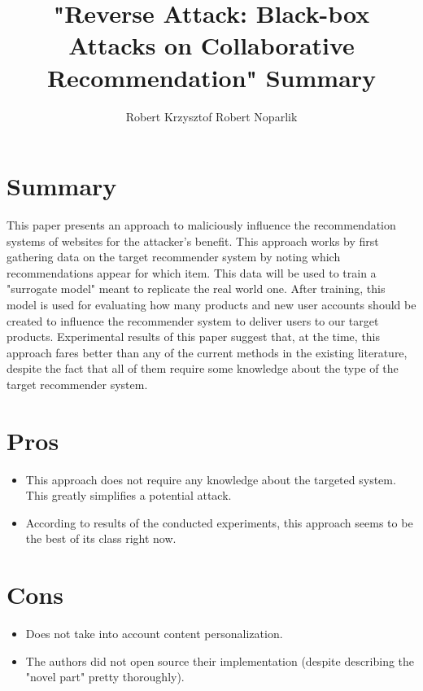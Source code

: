 \documentclass{article}
\title{"Reverse Attack: Black-box Attacks on Collaborative
Recommendation" Summary}
\author{Robert Krzysztof Robert Noparlik}
\begin{document}
\maketitle

\section{Summary}

This paper presents an approach to maliciously influence the recommendation systems of websites for the attacker's benefit. This approach works by first gathering data on the target recommender system by noting which recommendations appear for which item. This data will be used to train a "surrogate model" meant to replicate the real world one. After training, this model is used for evaluating how many products and new user accounts should be created to influence the recommender system to deliver users to our target products. Experimental results of this paper suggest that, at the time, this approach fares better than any of the current methods in the existing literature, despite the fact that all of them require some knowledge about the type of the target recommender system.


\section{Pros}

\begin{itemize}
	\item This approach does not require any knowledge about the targeted system. This greatly simplifies a potential attack. 

	\item According to results of the conducted experiments, this approach seems to be the best  of its class right now.
\end{itemize}

\section{Cons}

\begin{itemize}
	\item Does not take into account content personalization. 

	\item The authors did not open source their implementation (despite describing the "novel part" pretty thoroughly).
\end{itemize}
\end{document}
